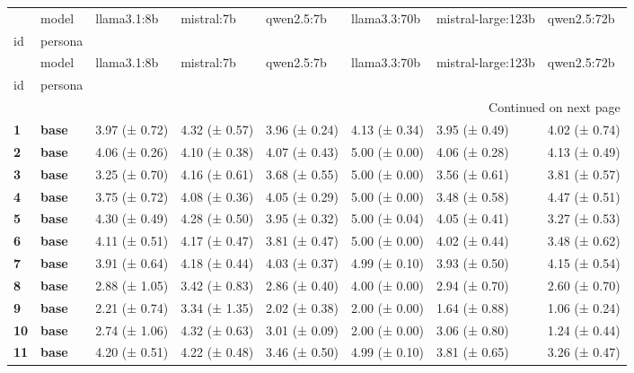 \begin{longtable}{llllllll}
\toprule
 & model & llama3.1:8b & mistral:7b & qwen2.5:7b & llama3.3:70b & mistral-large:123b & qwen2.5:72b \\
id & persona &  &  &  &  &  &  \\
\midrule
\endfirsthead
\toprule
 & model & llama3.1:8b & mistral:7b & qwen2.5:7b & llama3.3:70b & mistral-large:123b & qwen2.5:72b \\
id & persona &  &  &  &  &  &  \\
\midrule
\endhead
\midrule
\multicolumn{8}{r}{Continued on next page} \\
\midrule
\endfoot
\bottomrule
\endlastfoot
\textbf{1} & \textbf{base} & 3.97 (± 0.72) & 4.32 (± 0.57) & 3.96 (± 0.24) & 4.13 (± 0.34) & 3.95 (± 0.49) & 4.02 (± 0.74) \\
\cline{1-8}
\textbf{2} & \textbf{base} & 4.06 (± 0.26) & 4.10 (± 0.38) & 4.07 (± 0.43) & 5.00 (± 0.00) & 4.06 (± 0.28) & 4.13 (± 0.49) \\
\cline{1-8}
\textbf{3} & \textbf{base} & 3.25 (± 0.70) & 4.16 (± 0.61) & 3.68 (± 0.55) & 5.00 (± 0.00) & 3.56 (± 0.61) & 3.81 (± 0.57) \\
\cline{1-8}
\textbf{4} & \textbf{base} & 3.75 (± 0.72) & 4.08 (± 0.36) & 4.05 (± 0.29) & 5.00 (± 0.00) & 3.48 (± 0.58) & 4.47 (± 0.51) \\
\cline{1-8}
\textbf{5} & \textbf{base} & 4.30 (± 0.49) & 4.28 (± 0.50) & 3.95 (± 0.32) & 5.00 (± 0.04) & 4.05 (± 0.41) & 3.27 (± 0.53) \\
\cline{1-8}
\textbf{6} & \textbf{base} & 4.11 (± 0.51) & 4.17 (± 0.47) & 3.81 (± 0.47) & 5.00 (± 0.00) & 4.02 (± 0.44) & 3.48 (± 0.62) \\
\cline{1-8}
\textbf{7} & \textbf{base} & 3.91 (± 0.64) & 4.18 (± 0.44) & 4.03 (± 0.37) & 4.99 (± 0.10) & 3.93 (± 0.50) & 4.15 (± 0.54) \\
\cline{1-8}
\textbf{8} & \textbf{base} & 2.88 (± 1.05) & 3.42 (± 0.83) & 2.86 (± 0.40) & 4.00 (± 0.00) & 2.94 (± 0.70) & 2.60 (± 0.70) \\
\cline{1-8}
\textbf{9} & \textbf{base} & 2.21 (± 0.74) & 3.34 (± 1.35) & 2.02 (± 0.38) & 2.00 (± 0.00) & 1.64 (± 0.88) & 1.06 (± 0.24) \\
\cline{1-8}
\textbf{10} & \textbf{base} & 2.74 (± 1.06) & 4.32 (± 0.63) & 3.01 (± 0.09) & 2.00 (± 0.00) & 3.06 (± 0.80) & 1.24 (± 0.44) \\
\cline{1-8}
\textbf{11} & \textbf{base} & 4.20 (± 0.51) & 4.22 (± 0.48) & 3.46 (± 0.50) & 4.99 (± 0.10) & 3.81 (± 0.65) & 3.26 (± 0.47) \\

\end{longtable}
